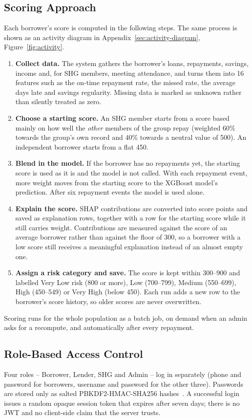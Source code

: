 \documentclass[11pt,a4paper]{article}
\begin{document}
\subsection{Scoring Approach}\label{sec:scoring}
Each borrower's score is computed in the following steps. The same process
is shown as an activity diagram in Appendix~\ref{sec:activity-diagram},
Figure~\ref{fig:activity}.
\begin{enumerate}
  \item \textbf{Collect data.} The system gathers the borrower's loans,
  repayments, savings, income and, for SHG members, meeting attendance, and
  turns them into 16 features such as the on-time repayment rate, the
  missed rate, the average days late and savings regularity. Missing data
  is marked as unknown rather than silently treated as zero.
  \item \textbf{Choose a starting score.} An SHG member starts from a score
  based mainly on how well the \emph{other} members of the group repay
  (weighted 60\% towards the group's own record and 40\% towards a neutral
  value of 500). An independent borrower starts from a flat 450.
  \item \textbf{Blend in the model.} If the borrower has no repayments yet,
  the starting score is used as it is and the model is not called. With
  each repayment event, more weight moves from the starting score to the
  XGBoost model's prediction. After six repayment events the model is used
  alone.
  \item \textbf{Explain the score.} SHAP contributions are converted into
  score points and saved as explanation rows, together with a row for the
  starting score while it still carries weight. Contributions are measured
  against the score of an average borrower rather than against the floor of
  300, so a borrower with a low score still receives a meaningful
  explanation instead of an almost empty one.
  \item \textbf{Assign a risk category and save.} The score is kept within
  300--900 and labelled Very Low risk (800 or more), Low (700--799), Medium
  (550--699), High (450--549) or Very High (below 450). Each run adds a new
  row to the borrower's score history, so older scores are never
  overwritten.
\end{enumerate}
Scoring runs for the whole population as a batch job, on demand when an
admin asks for a recompute, and automatically after every repayment.

\subsection{Role-Based Access Control}
Four roles -- Borrower, Lender, SHG and Admin -- log in separately (phone
and password for borrowers, username and password for the other three).
Passwords are stored only as salted PBKDF2-HMAC-SHA256
hashes~\cite{pbkdf2}. A successful login issues a random opaque session
token that expires after seven days; there is no JWT and no client-side
claim that the server trusts.
\end{document}

